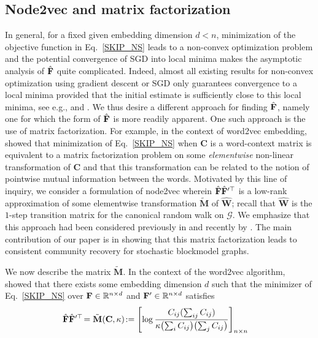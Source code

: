 \documentclass[10pt,journal,compsoc]{IEEEtran}
\newcommand{\ee}{\end{aligned} \end{equation}}
\newcommand{\bee}{\begin{equation}\begin{aligned}}
\newcommand{\M}[1]{{{\mathbf{\MakeUppercase{#1}}}}}
\numberwithin{equation}{section}
\begin{document}
\subsection{Node2vec and matrix factorization}\label{sec:MF}
{\color{black}
In general, for a fixed given embedding dimension $d < n$, 
minimization of the objective function in Eq.~\eqref{SKIP_NS} leads to
a non-convex optimization problem and the potential convergence of SGD
into local minima makes the asymptotic analysis of $\hat{\M F}$ quite
complicated. Indeed, almost all existing results for non-convex optimization using gradient descent or SGD only guarantees convergence to a local minima provided that the initial estimate is sufficiently close to this local minima, see e.g., \cite[Section 5]{chi2019nonconvex} and \cite{sgd_convergence}.
We thus desire a different approach for finding $\hat{\M
  F}$, namely one for which the form of $\hat{\M F}$ is more readily
apparent. One such approach is the use of matrix factorization.  
For example, in the context of word2vec embedding,
\cite{levy2014neural} showed that minimization of Eq.~\eqref{SKIP_NS}
when $\mathbf{C}$ is a word-context matrix is equivalent to a matrix
factorization problem on some {\em elementwise} non-linear transformation
of $\mathbf{C}$ and that this transformation can be related to the notion of pointwise
mutual information between the words. Motivated by this line of inquiry,
we consider a formulation of node2vec wherein $\hat{\M
  F} \hat{\M F}'^{\top}$ is a low-rank approximation of
some elementwise transformation $\tilde{\mathbf{M}}$ of $\hat{\mathbf{W}}$;
recall that $\hat{\mathbf{W}}$ is the $1$-step transition matrix for
the canonical random walk on $\mathcal{G}$. %
We emphasize that this approach had
been considered previously in \cite{qiu2018network} and recently by \cite{barot2021community,sussman_vec}. The main
contribution of our paper is in showing that this matrix
factorization leads to consistent community recovery for stochastic blockmodel graphs. 

We now describe the matrix $\tilde{\mathbf{M}}$. 
 In the context of the word2vec algorithm,
\cite{levy2014neural} showed that there exists some embedding dimension $d$ such that the minimizer of Eq.~\eqref{SKIP_NS} over $\M F \in
\mathbb{R}^{n \times d}$ and $\M F' \in \mathbb{R}^{n \times d}$ satisfies
\bee\label{Fact}
\hat{\M F}\hat{\M F}'^\top \!&=\tilde{\M M}(\M C,\kappa) 
\!:= \left[\log \frac{C_{ij}(\sum_{ij}C_{ij})}{\kappa\bigl(\sum_{i}C_{ij}\bigr) \bigl( \sum_{j}C_{ij}\bigr)}\right]_{n\times n}
\ee

}
\end{document}
